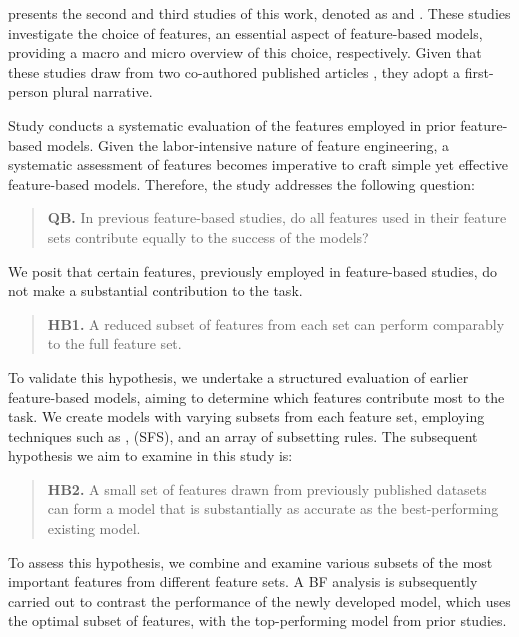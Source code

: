  presents the second and third studies of this work, denoted as \studB and \studC. These studies investigate the choice of features, an essential aspect of feature-based \context models, providing a macro and micro overview of this choice, respectively. Given that these studies draw from two co-authored published articles \citep{same-van-deemter-2020-linguistic,same-van-deemter-2020-computational}, they adopt a first-person plural narrative.

Study \studB  conducts a systematic evaluation of the features employed in prior feature-based \context models. Given the labor-intensive nature of feature engineering, a systematic assessment of features becomes imperative to craft simple yet effective feature-based models. Therefore, the study addresses the following question:

\begin{quote}
	\textbf{QB.} In previous feature-based \context studies, do all features used in their feature sets contribute equally to the success of the models?
\end{quote} 

We posit that certain features, previously employed in feature-based \context studies, do not make a substantial contribution to the task. 

\begin{quote}
	\textbf{HB1.} A reduced subset of features from each set can perform comparably to the full feature set.
\end{quote} 

To validate this hypothesis, we undertake a structured evaluation of earlier feature-based \context models, aiming to determine which features contribute most to the task. We create models with varying subsets from each feature set, employing techniques such as ,  (SFS), and an array of subsetting rules. The subsequent hypothesis we aim to examine in this study is:

\begin{quote}
	\textbf{HB2.} A small set of features drawn from previously published datasets can form a model that is substantially as accurate as the best-performing existing model.
\end{quote} 

To assess this hypothesis, we combine and examine various subsets of the most important features from different feature sets. A BF analysis is subsequently carried out to contrast the performance of the newly developed model, which uses the optimal subset of features, with the top-performing model from prior \context studies.

